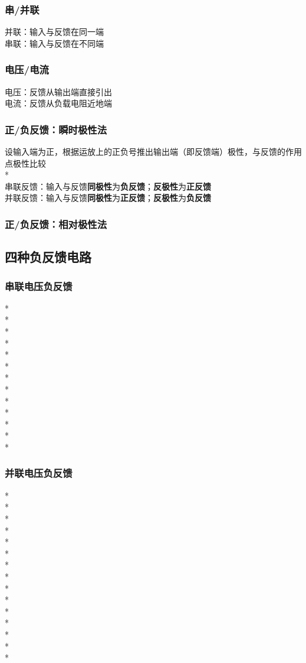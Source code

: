 \documentclass[UTF8, fontset=none]{ctexart}
\begin{document}
\begin{multicols*}{8}
\subsubsection{串/并联}
并联：输入与反馈在同一端\\
串联：输入与反馈在不同端\\
\subsubsection{电压/电流}
电压：反馈从输出端直接引出\\
电流：反馈从负载电阻近地端\\
\subsubsection{正/负反馈：瞬时极性法}
设输入端为正，根据运放上的正负号推出输出端（即反馈端）极性，与反馈的作用点极性比较\\
*\\
串联反馈：输入与反馈\textbf{同极性}为\textbf{负反馈}；\textbf{反极性}为\textbf{正反馈}\\
并联反馈：输入与反馈\textbf{同极性}为\textbf{正反馈}；\textbf{反极性}为\textbf{负反馈}\\
\subsubsection{正/负反馈：相对极性法}
\subsection{四种负反馈电路}
\subsubsection{串联电压负反馈}
*\\
*\\
*\\
*\\
*\\
*\\
*\\
*\\
*\\
*\\
*\\
*\\
*
\subsubsection{并联电压负反馈}
*\\
*\\
*\\
*\\
*\\
*\\
*\\
*\\
*\\
*\\
*\\
*\\
*\\
*\\
*

\end{multicols*}
\end{document}
